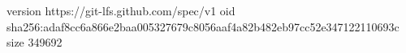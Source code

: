 version https://git-lfs.github.com/spec/v1
oid sha256:adaf8cc6a866e2baa005327679c8056aaf4a82b482eb97cc52e347122110693c
size 349692
